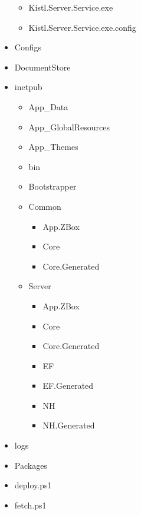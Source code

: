 \begin{itemize}
{\begin{itemize}
{\begin{itemize}
{\begin{itemize}
  	  	  	  	  \item Core.Generated
  	  	  	  	  \item EF
  	  	  	  	  \item EF.Generated
  	  	  	  	  \item NH
  	  	  	  	  \item NH.Generated
  	  	  	  	 \end{itemize}
  	  	  	  }
  	  	  	  \item Kistl.Server.Service.exe
  	  	  	  \item Kistl.Server.Service.exe.config
  	  	  	\end{itemize}  
  		}
  	  	\end{itemize}
  	  }
  	  \item Configs
  	  \item DocumentStore
  	  \item { inetpub
  	  	\begin{itemize} 
  	  	  \item App\_Data
  	  	  \item App\_GlobalResources
  	  	  \item App\_Themes
  	  	  \item bin
  	  	  \item Bootstrapper
  	  	  \item { Common
  	  	  	\begin{itemize}
  	  	  	  \item App.ZBox
  	  	  	  \item Core
  	  	  	  \item Core.Generated
  	  	  	 \end{itemize}
  	  	  }
  	  	  \item { Server
  	  	  	\begin{itemize}
  	  	  	  \item App.ZBox
  	  	  	  \item Core
  	  	  	  \item Core.Generated
  	  	  	  \item EF
  	  	  	  \item EF.Generated
  	  	  	  \item NH
  	  	  	  \item NH.Generated
  	  	  	 \end{itemize}
  	  	  }
  	  	  \end{itemize} 
  	  }
  	  \item logs
  	  \item Packages
  	  \item deploy.ps1
  	  \item fetch.ps1
  	\end{itemize} 

